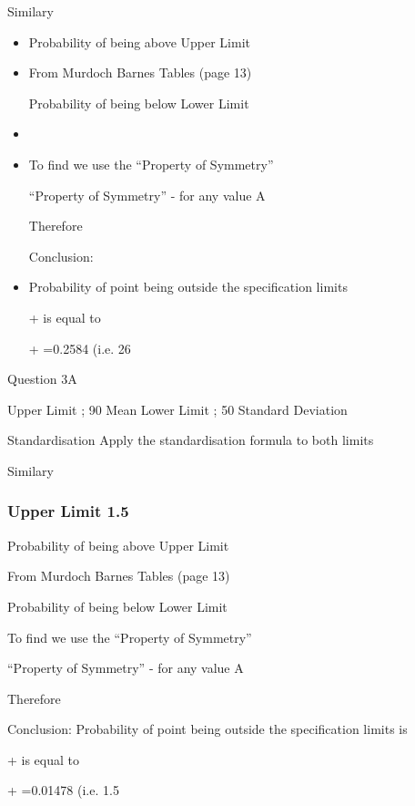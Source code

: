 \documentclass[]{report}
\begin{document}
Similary



\begin{itemize}
\item Probability of being above Upper Limit

\item From Murdoch Barnes Tables (page 13)  

Probability of being below Lower Limit


\item \item To find   we use the “Property of Symmetry”

“Property of Symmetry” -   for any value A

Therefore 

Conclusion: 
\item Probability of point being outside the specification limits 

+ is equal to

+ =0.2584 	(i.e. 26%
\end{itemize}













Question 3A

Upper Limit ; 90		Mean		 	
Lower Limit ; 50		Standard Deviation	 

Standardisation
Apply the standardisation formula	 	to both limits


Similary


\subsubsection{Upper Limit 1.5}
Probability of being above Upper Limit

From Murdoch Barnes Tables (page 13)  

Probability of being below Lower Limit


To find   we use the “Property of Symmetry”

“Property of Symmetry” -   for any value A

Therefore 

Conclusion: 
Probability of point being outside the specification limits is

+ is equal to


+ =0.01478  	(i.e. 1.5%
\end{document}
